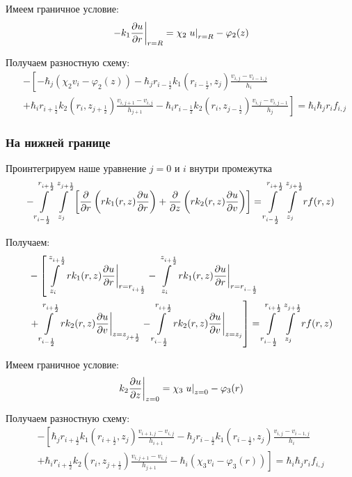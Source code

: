 Имеем граничное условие:
\[
  \left . -k_1 \pdv{u}{r} \right \vert_{r=R} = \chi_2 \left . u \right \vert_{r=R} - \varphi_2(z)
\]

Получаем разностную схему:
\begin{align*}
  &- \left [ 
  -\hbar_j ( \chi_2 v_i - \varphi_2(z))
  - \hbar_j r_{i-\frac{1}{2}} k_1(r_{i-\frac{1}{2}}, z_j) \frac{v_{i, j} - v_{i - 1, j}}{h_{i}}
  \right . \\
  &\left .
  + \hbar_i r_{i+\frac{1}{2}} k_2(r_i, z_{j+\frac{1}{2}}) \frac{v_{i, j + 1} - v_{i, j}}{h_{j + 1}}
  - \hbar_i r_{i-\frac{1}{2}} k_2(r_i, z_{j-\frac{1}{2}}) \frac{v_{i, j} - v_{i, j - 1}}{h_j}
  \right ]  = \hbar_i \hbar_j r_i f_{i, j}
\end{align*}

\subsubsection{На нижней границе}
Проинтегрируем наше уравнение $ j = 0 $ и $ i $ внутри промежутка
\[
  - \int\limits^{r_{i +\frac{1}{2}}}_{r_{i -\frac{1}{2}}} \int\limits^{z_{j +\frac{1}{2}}}_{z_{j }} \left [ \pdv{}{r} \left ( r k_1(r, z) \pdv{u}{r} \right ) 
  + \pdv{}{z} \left ( rk_2(r, z)\pdv{u}{v} \right ) \right ] = \int\limits^{r_{i +\frac{1}{2}}}_{r_{i -\frac{1}{2}}} \int\limits^{z_{j +\frac{1}{2}}}_{z_{j }} rf(r, z)
\]

Получаем:
\begin{align*}
  &- \left [
   \int\limits^{z_{i+\frac{1}{2}}}_{z_{i}}  \left . r k_1(r, z) \pdv{u}{r} \right \vert_{r = r_{i + \frac{1}{2}}}
  - \int\limits^{z_{i+\frac{1}{2}}}_{z_{i}} \left . r k_1(r, z) \pdv{u}{r} \right \vert_{r = r_{i - \frac{1}{2}}}
  \right . \\
  &\left . + \int\limits^{r_{i+\frac{1}{2}}}_{r_{i-\frac{1}{2}}} \left . rk_2(r, z)\pdv{u}{v} \right \vert_{z = z_{j + \frac{1}{2}}}
  - \int\limits^{r_{i+\frac{1}{2}}}_{r_{i-\frac{1}{2}}} \left . rk_2(r, z)\pdv{u}{v} \right \vert_{z = z_{j}}
  \right ] = \int\limits^{r_{i +\frac{1}{2}}}_{r_{i -\frac{1}{2}}} \int\limits^{z_{j +\frac{1}{2}}}_{z_{j }} rf(r, z)
\end{align*}

Имеем граничное условие:
\[
  \left . k_2 \pdv{u}{z} \right \vert_{z=0} = \chi_3 \left . u \right \vert_{z=0} - \varphi_3(r)
\]

Получаем разностную схему:
\begin{align*}
  - \left [ 
  \hbar_j r_{i+\frac{1}{2}} k_1(r_{i+\frac{1}{2}}, z_j) \frac{v_{i+1, j} - v_{i, j}}{h_{i + 1}}
  - \hbar_j r_{i-\frac{1}{2}} k_1(r_{i-\frac{1}{2}}, z_j) \frac{v_{i, j} - v_{i - 1, j}}{h_{i}}
  \right . \\
  \left .
  + \hbar_i r_{i+\frac{1}{2}} k_2(r_i, z_{j+\frac{1}{2}}) \frac{v_{i, j + 1} - v_{i, j}}{h_{j + 1}}
  - \hbar_i(\chi_3 v_i - \varphi_3(r))
  \right ]  = \hbar_i \hbar_j r_i f_{i, j}
\end{align*}

